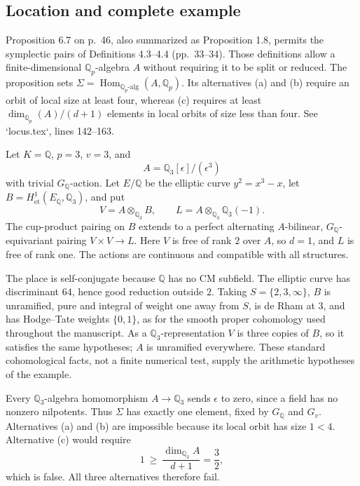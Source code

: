 \documentclass[10pt]{article}
\begin{document}
\subsection*{Location and complete example}
Proposition 6.7 on p. 46, also summarized as Proposition 1.8, permits the symplectic pairs of Definitions 4.3–4.4 (pp. 33–34). Those definitions allow a finite-dimensional \(\mathbb Q_p\)-algebra \(A\) without requiring it to be split or reduced. The proposition sets \(\Sigma=\operatorname{Hom}_{\mathbb Q_p\text{-alg}}(A,\mathbb Q_p)\). Its alternatives (a) and (b) require an orbit of local size at least four, whereas (c) requires at least \(\dim_{\mathbb Q_p}(A)/(d+1)\) elements in local orbits of size less than four. See `locus.tex`, lines 142–163.\par
Let \(K=\mathbb Q\), \(p=3\), \(v=3\), and \[A=\mathbb Q_3[\epsilon]/(\epsilon^3)\] with trivial \(G_\mathbb Q\)-action. Let \(E/\mathbb Q\) be the elliptic curve \(y^2=x^3-x\), let \(B=H^1_{\mathrm{\acute et}}(E_{\overline{\mathbb Q}},\mathbb Q_3)\), and put \[V=A\otimes_{\mathbb Q_3}B,\qquad
L=A\otimes_{\mathbb Q_3}\mathbb Q_3(-1).\] The cup-product pairing on \(B\) extends to a perfect alternating \(A\)-bilinear, \(G_\mathbb Q\)-equivariant pairing \(V\times V\to L\). Here \(V\) is free of rank \(2\) over \(A\), so \(d=1\), and \(L\) is free of rank one. The actions are continuous and compatible with all structures.\par
The place is self-conjugate because \(\mathbb Q\) has no CM subfield. The elliptic curve has discriminant \(64\), hence good reduction outside \(2\). Taking \(S=\{2,3,\infty\}\), \(B\) is unramified, pure and integral of weight one away from \(S\), is de Rham at \(3\), and has Hodge–Tate weights \(\{0,1\}\), as for the smooth proper cohomology used throughout the manuscript. As a \(\mathbb Q_3\)-representation \(V\) is three copies of \(B\), so it satisfies the same hypotheses; \(A\) is unramified everywhere. These standard cohomological facts, not a finite numerical test, supply the arithmetic hypotheses of the example.\par
Every \(\mathbb Q_3\)-algebra homomorphism \(A\to\mathbb Q_3\) sends \(\epsilon\) to zero, since a field has no nonzero nilpotents. Thus \(\Sigma\) has exactly one element, fixed by \(G_\mathbb Q\) and \(G_v\). Alternatives (a) and (b) are impossible because its local orbit has size \(1<4\). Alternative (c) would require \[1\ \geq\ \frac{\dim_{\mathbb Q_3}A}{d+1}=\frac32,\] which is false. All three alternatives therefore fail.\par
\end{document}
